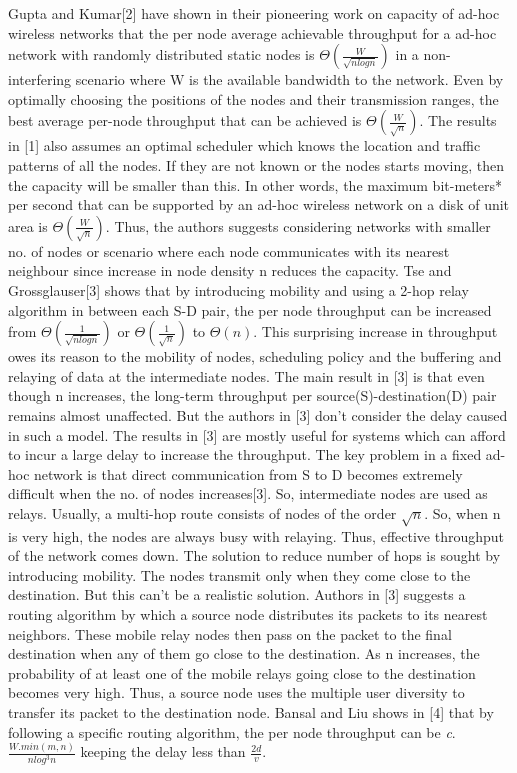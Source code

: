 \documentclass[conference]{IEEEtran}
\begin{document}
Gupta and Kumar[2] have shown in their pioneering work on capacity of ad-hoc wireless networks that the per node average 
achievable throughput for a ad-hoc network with randomly distributed static nodes is $\Theta(\frac{W}{\sqrt{nlogn}})$ in a non-interfering 
scenario where W is the available bandwidth to the network. Even by optimally choosing the positions of the nodes and
 their transmission ranges, the best average per-node throughput that can be achieved is $\Theta(\frac{W}{\sqrt{n}})$. The results in [1] also 
assumes an optimal scheduler which knows the location and traffic patterns of all the nodes. If they are not known or 
the nodes starts moving, then the capacity will be smaller than this.  In other words, the maximum bit-meters* per second 
that can be supported by an ad-hoc wireless network on a disk of unit area is $\Theta(\frac{W}{\sqrt{n}})$. Thus, the authors suggests 
considering networks with smaller no. of nodes or scenario where each node communicates with its nearest neighbour 
since increase in node density n reduces the capacity. Tse and Grossglauser[3] shows that by introducing mobility and 
using a 2-hop relay algorithm in between each S-D pair, the per node throughput can be increased from $\Theta(\frac{1}{\sqrt{nlogn}})$ or 
$\Theta(\frac{1}{\sqrt{n}})$ to $\Theta(n)$. This surprising increase in throughput owes its reason to the mobility of nodes, scheduling policy and 
the buffering and relaying of data at the intermediate nodes.  The main result in [3] is that even though n increases, 
the long-term throughput per source(S)-destination(D) pair remains almost unaffected. But the authors in [3] don’t 
consider the delay caused in such a model. The results in [3] are mostly useful for systems which can afford to incur
 a large delay to increase the throughput. The key problem in a fixed ad-hoc network is that direct communication from
 S to D becomes extremely difficult when the no. of nodes increases[3]. So, intermediate nodes are used as relays.
 Usually, a multi-hop route consists of nodes of the order $\sqrt{n}$. So, when n is very high, the nodes are always busy with 
relaying. Thus, effective throughput of the network comes down. The solution to reduce number of hops is sought by introducing 
mobility. The nodes transmit only when they come close to the destination. But this can’t be a realistic solution. Authors
 in [3] suggests a routing algorithm by which a source node distributes its packets to its nearest neighbors. These mobile 
relay nodes then pass on the packet to the final destination when any of them go close to the destination. As n increases, 
the probability of at least one of the mobile relays going close to the destination becomes very high. Thus, a source node 
uses the multiple user diversity to transfer its packet to the destination node. Bansal and Liu shows in [4] that by 
following a specific routing algorithm, the per node throughput can be \emph{c}.$\frac{W.min(m,n)}{nlog^{3}n}$ keeping the delay less than $\frac{2d}{v}$.
\end{document}
